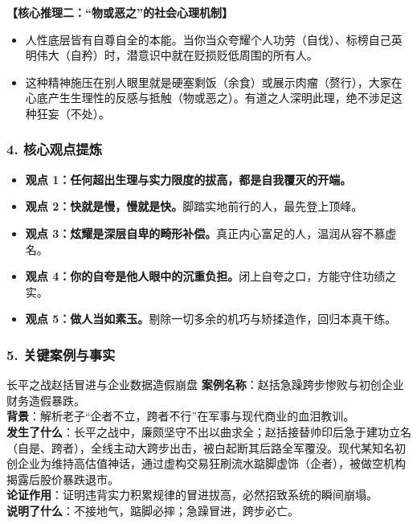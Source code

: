 \noindent\textbf{【核心推理二：“物或恶之”的社会心理机制】}
\begin{itemize}
    \item 人性底层皆有自尊自全的本能。当你当众夸耀个人功劳（自伐）、标榜自己英明伟大（自矜）时，潜意识中就在贬损贬低周围的所有人。
    \item 这种精神施压在别人眼里就是硬塞剩饭（余食）或展示肉瘤（赘行），大家在心底产生生理性的反感与抵触（物或恶之）。有道之人深明此理，绝不涉足这种狂妄（不处）。
\end{itemize}

\subsubsection{4. 核心观点提炼}
\begin{itemize}
    \item \textbf{观点 1：任何超出生理与实力限度的拔高，都是自我覆灭的开端。}
    \item \textbf{观点 2：快就是慢，慢就是快。}脚踏实地前行的人，最先登上顶峰。
    \item \textbf{观点 3：炫耀是深层自卑的畸形补偿。}真正内心富足的人，温润从容不慕虚名。
    \item \textbf{观点 4：你的自夸是他人眼中的沉重负担。}闭上自夸之口，方能守住功绩之实。
    \item \textbf{观点 5：做人当如素玉。}剔除一切多余的机巧与矫揉造作，回归本真干练。
\end{itemize}

\subsubsection{5. 关键案例与事实}
\begin{CaseBox}{长平之战赵括冒进与企业数据造假崩盘}
\textbf{案例名称}：赵括急躁跨步惨败与初创企业财务造假暴跌。\\
\textbf{背景}：解析老子“企者不立，跨者不行”在军事与现代商业的血泪教训。\\
\textbf{发生了什么}：长平之战中，廉颇坚守不出以曲求全；赵括接替帅印后急于建功立名（自是、跨者），全线主动大跨步出击，被白起断其后路全军覆没。现代某知名初创企业为维持高估值神话，通过虚构交易狂刷流水踮脚虚饰（企者），被做空机构揭露后股价暴跌退市。\\
\textbf{论证作用}：证明违背实力积累规律的冒进拔高，必然招致系统的瞬间崩塌。\\
\textbf{说明了什么}：不接地气，踮脚必摔；急躁冒进，跨步必亡。
\end{CaseBox}

